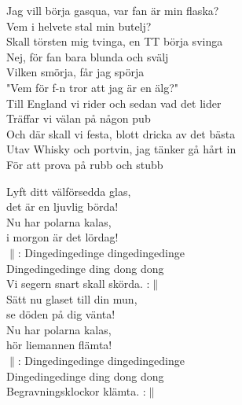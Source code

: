\documentclass[a6paper,10pt]{article}
\begin{document}
\setlength{\oddsidemargin}{-0.47in}
\noindent
{}
\small
\begin{center}
\end{center}
\begin{lyrics}
Jag vill börja gasqua, var fan är min flaska?\\
Vem i helvete stal min butelj?\\
Skall törsten mig tvinga, en TT börja svinga\\
Nej, för fan bara blunda och svälj\\
Vilken smörja, får jag spörja\\
"Vem för f-n tror att jag är en älg?"\\
 \newline
Till England vi rider och sedan vad det lider\\
Träffar vi välan på någon pub\\
Och där skall vi festa, blott dricka av det bästa\\
Utav Whisky och portvin, jag tänker gå hårt in\\
För att prova på rubb och stubb
\end{lyrics}
%

\setlength{\oddsidemargin}{-0.37in}
\begin{center}
\end{center}
\begin{lyrics}
Lyft ditt välförsedda glas, \\
det är en ljuvlig börda! \\
Nu har polarna kalas, \\
i morgon är det lördag! \\
$\|$: Dingedingedinge dingedingedinge \\
Dingedingedinge ding dong dong \\
Vi segern snart skall skörda. :$\|$ \\
\newline
Sätt nu glaset till din mun, \\
se döden på dig vänta! \\
Nu har polarna kalas, \\
hör liemannen flämta! \\
$\|$: Dingedingedinge dingedingedinge \\
Dingedingedinge ding dong dong \\
Begravningsklockor klämta. :$\|$
\end{lyrics}
\end{document}
